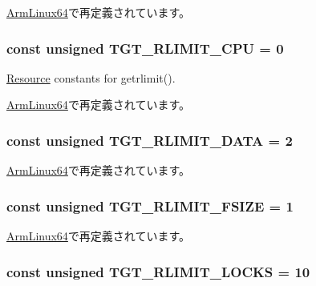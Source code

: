 \hyperlink{classArmLinux64_a599454267926920de3bd5a488bda3e03a89e77f710c8de2c5d30f835b6f9ecff4}{ArmLinux64}で再定義されています。\hypertarget{classLinux_a2e4654637dbfb58e118058627146b080}{
\subsubsection[{TGT\_\-RLIMIT\_\-CPU}]{\setlength{\rightskip}{0pt plus 5cm}const unsigned {\bf TGT\_\-RLIMIT\_\-CPU} = 0}}
\label{classLinux_a2e4654637dbfb58e118058627146b080}


\hyperlink{classResource}{Resource} constants for getrlimit(). 

\hyperlink{classArmLinux64_a599454267926920de3bd5a488bda3e03ad2d72256a0d172755a5984018f2afad8}{ArmLinux64}で再定義されています。\hypertarget{classLinux_ab7cdbf4aa0a8adf81dd4b7296f3f569e}{
\subsubsection[{TGT\_\-RLIMIT\_\-DATA}]{\setlength{\rightskip}{0pt plus 5cm}const unsigned {\bf TGT\_\-RLIMIT\_\-DATA} = 2}}
\label{classLinux_ab7cdbf4aa0a8adf81dd4b7296f3f569e}


\hyperlink{classArmLinux64_a599454267926920de3bd5a488bda3e03abcf6a52c98bdfad0832696b231de99a2}{ArmLinux64}で再定義されています。\hypertarget{classLinux_ac9f91f21e30cdd3121d5df0c433bc9b2}{
\subsubsection[{TGT\_\-RLIMIT\_\-FSIZE}]{\setlength{\rightskip}{0pt plus 5cm}const unsigned {\bf TGT\_\-RLIMIT\_\-FSIZE} = 1}}
\label{classLinux_ac9f91f21e30cdd3121d5df0c433bc9b2}


\hyperlink{classArmLinux64_a599454267926920de3bd5a488bda3e03ae0f07966ad956cd9e702fb01a4f3a9a1}{ArmLinux64}で再定義されています。\hypertarget{classLinux_a173b686f10c7ca880e7a9527195a1816}{
\subsubsection[{TGT\_\-RLIMIT\_\-LOCKS}]{\setlength{\rightskip}{0pt plus 5cm}const unsigned {\bf TGT\_\-RLIMIT\_\-LOCKS} = 10}}
\label{classLinux_a173b686f10c7ca880e7a9527195a1816}


